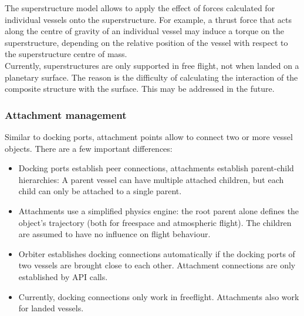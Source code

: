 \documentclass[Orbiter Developer Manual.tex]{subfiles}
\begin{document}
\noindent
The superstructure model allows to apply the effect of forces calculated for individual vessels onto the superstructure. For example, a thrust force that acts along the centre of gravity of an individual vessel may induce a torque on the superstructure, depending on the relative position of the vessel with respect to the superstructure centre of mass.\\
Currently, superstructures are only supported in free flight, not when landed on a planetary surface. The reason is the difficulty of calculating the interaction of the composite structure with the surface. This may be addressed in the future.


\subsubsection{Attachment management}
\label{sssec:attach_mgmt}
Similar to docking ports, attachment points allow to connect two or more vessel objects. There are a few important differences:
\begin{itemize}
\item Docking ports establish peer connections, attachments establish parent-child hierarchies: A parent vessel can have multiple attached children, but each child can only be attached to a single parent.
\item Attachments use a simplified physics engine: the root parent alone defines the object's trajectory (both for freespace and atmospheric flight). The children are assumed to have no influence on flight behaviour.
\item Orbiter establishes docking connections automatically if the docking ports of two vessels are brought close to each other. Attachment connections are only established by API calls.
\item Currently, docking connections only work in freeflight. Attachments also work for landed vessels.
\end{itemize}
\end{document}
